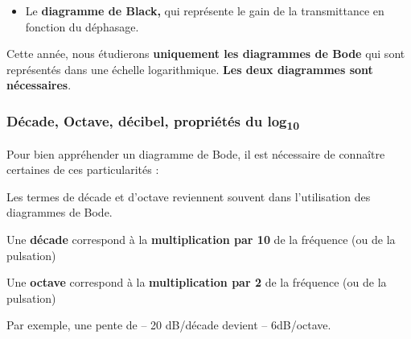 \begin{itemize}
\item
  Le \textbf{diagramme de Black,} qui représente le gain de la transmittance en fonction du déphasage.
\end{itemize}

Cette année, nous étudierons \textbf{uniquement les diagrammes de Bode} qui sont représentés dans une échelle logarithmique. \textbf{Les deux diagrammes sont nécessaires}.

\hypertarget{mod-duxe9cade-octave-duxe9cibel-propriuxe9tuxe9s-du-log10}{%
\subsubsection{\texorpdfstring{Décade, Octave, décibel, propriétés du log\textsubscript{10}}{Décade, Octave, décibel, propriétés du log10}}\label{mod-duxe9cade-octave-duxe9cibel-propriuxe9tuxe9s-du-log10}}

Pour bien appréhender un diagramme de Bode, il est nécessaire de connaître certaines de ces particularités :

Les termes de décade et d'octave reviennent souvent dans l'utilisation des diagrammes de Bode.

Une \textbf{décade} correspond à la \textbf{multiplication par 10} de la fréquence (ou de la pulsation)

Une \textbf{octave} correspond à la \textbf{multiplication par 2} de la fréquence (ou de la pulsation)

Par exemple, une pente de -- 20 dB/décade devient -- 6dB/octave.

